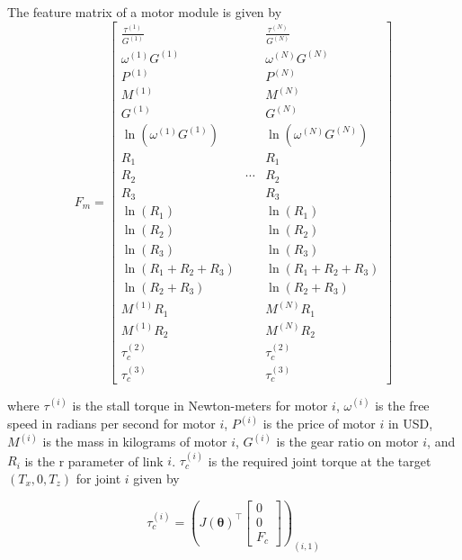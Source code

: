 \documentclass{article}
\begin{document}
The feature matrix of a motor module is given by
\begin{equation}
    F_m =
    \begin{bmatrix}
        \frac{\tau^{(1)}}{G^{(1)}} & & \frac{\tau^{(N)}}{G^{(N)}} \\[6pt]
        \omega^{(1)} G^{(1)} & & \omega^{(N)} G^{(N)} \\[6pt]
        P^{(1)} & & P^{(N)} \\[6pt]
        M^{(1)} & & M^{(N)} \\[6pt]
        G^{(1)} & & G^{(N)} \\[6pt]
        \ln(\omega^{(1)} G^{(1)}) & & \ln(\omega^{(N)} G^{(N)}) \\[6pt]
        R_1 & & R_1 \\[6pt]
        R_2 & \cdots & R_2 \\[6pt]
        R_3 & & R_3 \\[6pt]
        \ln(R_1) & & \ln(R_1) \\[6pt]
        \ln(R_2) & & \ln(R_2) \\[6pt]
        \ln(R_3) & & \ln(R_3) \\[6pt]
        \ln(R_1 + R_2 + R_3) & & \ln(R_1 + R_2 + R_3) \\[6pt]
        \ln(R_2 + R_3) & & \ln(R_2 + R_3) \\[6pt]
        M^{(1)} R_1 & & M^{(N)} R_1 \\[6pt]
        M^{(1)} R_2 & & M^{(N)} R_2 \\[6pt]
        \tau_c^{(2)} & & \tau_c^{(2)} \\[6pt]
        \tau_c^{(3)} & & \tau_c^{(3)}
    \end{bmatrix}
\end{equation}

where $\tau^{(i)}$ is the stall torque in Newton-meters for motor $i$,
$\omega^{(i)}$ is the free speed in radians per second for motor $i$, $P^{(i)}$
is the price of motor $i$ in USD, $M^{(i)}$ is the mass in kilograms of motor
$i$, $G^{(i)}$ is the gear ratio on motor $i$, and $R_i$ is the r parameter of
link $i$. $\tau_c^{(i)}$ is the required joint torque at the target $(T_x, 0,
T_z)$ for joint $i$ given by

\begin{equation}
    \tau_c^{(i)} = \left(
        J(\bm{\theta})^\top \begin{bmatrix}
            0 \\
            0 \\
            F_c
        \end{bmatrix}
        \right)_{(i,1)}
\end{equation}
\end{document}
